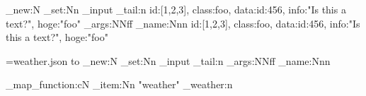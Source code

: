 \documentclass{article}
\def\readJson#1#2{%
  \prop_new:N #1
  \tl_set:Nn \cdr_input { \tl_tail:n { #2 } }
  \exp_args:NNff \inside_name:Nnn #1 {} { #2 }
}
\def\showById#1#2{%
  \prop_item:Nn #1 { #2 }
}
\def\getById#1#2#3{%
  \prop_get:NnN #1 { #2 } #3
}
\def\showArray#1{%
  \seq_use:cnnn { #1 } { ~and~ } { ,~ } { ,~and~ }
}
\def\showWeather#1{%
  \seq_map_function:cN #1 \format_weather:n
}
\begin{document}
\makeatletter

\readJson{\MyJson}{{id:[1,2,3], class:foo, data:{id:456}, info:"Is this a text?", hoge:"foo"}}


\newread\injson \openin\injson=weather.json
\read\injson to \data
\readJson{\TokyoJp}{\data}


\edef\tokyoweather{\showById{\TokyoJp}{"weather"}}

\showWeather{\tokyoweather}












\makeatother
\end{document}
